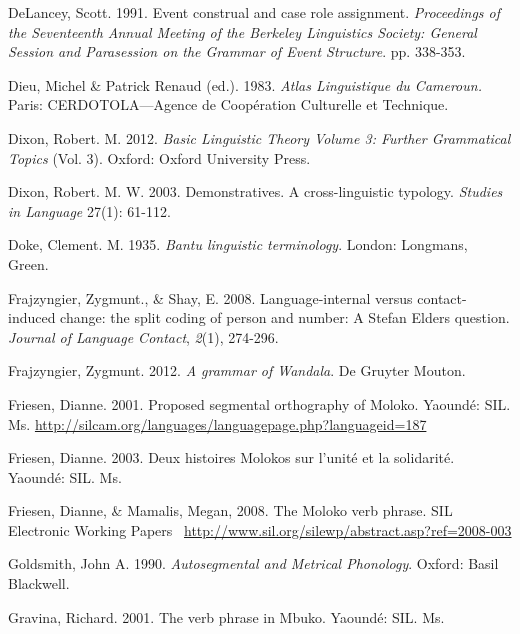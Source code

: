 DeLancey, Scott. 1991. Event construal and case role assignment. \textit{Proceedings of the Seventeenth Annual Meeting of the Berkeley Linguistics Society: General Session and Parasession on the Grammar of Event Structure}. pp. 338-353.

\begin{styleTableheader}
Dieu, Michel \& Patrick Renaud (ed.).  1983. \textit{Atlas Linguistique du Cameroun.}  Paris: CERDOTOLA—Agence de Coopération Culturelle et Technique.
\end{styleTableheader}

Dixon, Robert. M. 2012. \textit{Basic Linguistic Theory Volume 3: Further Grammatical Topics} (Vol. 3). Oxford: Oxford University Press.

\begin{styleTableheader}
Dixon, Robert. M. W. 2003. Demonstratives. A cross-linguistic typology. \textit{Studies in Language }27(1): 61-112.
\end{styleTableheader}

\begin{styleTableheader}
Doke, Clement. M. 1935. \textit{Bantu linguistic terminology}. London: Longmans, Green.
\end{styleTableheader}

Frajzyngier, Zygmunt., \& Shay, E. 2008. Language-internal versus contact-induced change: the split coding of person and number: A Stefan Elders question. \textit{Journal of Language Contact}, \textit{2}(1), 274-296.

Frajzyngier, Zygmunt. 2012. \textit{A grammar of Wandala}. De Gruyter Mouton.

Friesen, Dianne.  2001.  Proposed segmental orthography of Moloko.  Yaoundé:  SIL. Ms. \url{http://silcam.org/languages/languagepage.php?languageid=187}

Friesen, Dianne.  2003.  Deux histoires Molokos sur l’unité et la solidarité.  Yaoundé:  SIL. Ms.

Friesen, Dianne, \& Mamalis, Megan, 2008. The Moloko verb phrase. SIL Electronic Working Papers ~\url{http://www.sil.org/silewp/abstract.asp?ref=2008-003}

\begin{styleexamplegloss}
Goldsmith, John A.  1990.  \textit{Autosegmental and Metrical Phonology}.  Oxford: Basil Blackwell.
\end{styleexamplegloss}

\begin{styleTableheader}
Gravina, Richard.  2001.  The verb phrase in Mbuko.  Yaoundé: SIL. Ms.
\end{styleTableheader}

